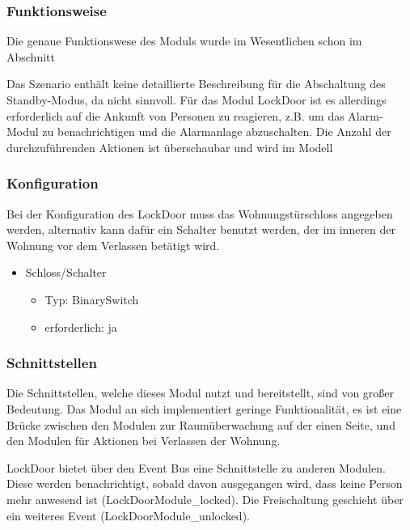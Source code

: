 \subsubsection{Funktionsweise}
Die genaue Funktionswese des Moduls wurde im Wesentlichen schon im Abschnitt %

Das Szenario enthält keine detaillierte Beschreibung für die Abschaltung des Standby-Modus, da nicht sinnvoll. Für das Modul LockDoor ist es allerdings erforderlich auf die Ankunft von Personen zu reagieren, z.B. um das Alarm-Modul zu benachrichtigen und die Alarmanlage abzuschalten. Die Anzahl der durchzuführenden Aktionen ist überschaubar und wird im Modell %


\subsubsection{Konfiguration}
Bei der Konfiguration des LockDoor muss das Wohnungstürschloss angegeben werden, alternativ kann dafür ein Schalter benutzt werden, der im inneren der Wohnung vor dem Verlassen betätigt wird. 
\begin{itemize}
	\item Schloss/Schalter
	\begin{itemize}
		\item Typ: BinarySwitch
		\item erforderlich: ja
	\end{itemize}
\end{itemize}

\subsubsection{Schnittstellen}
Die Schnittstellen, welche dieses Modul nutzt und bereitstellt, sind von großer Bedeutung. Das Modul an sich implementiert geringe Funktionalität, es ist eine Brücke zwischen den Modulen zur Raumüberwachung auf der einen Seite, und den Modulen für Aktionen bei Verlassen der Wohnung.

LockDoor bietet über den Event Bus eine Schnittstelle zu anderen Modulen. Diese werden benachrichtigt, sobald davon ausgegangen wird, dass keine Person mehr anwesend ist (LockDoorModule\_locked). Die Freischaltung geschieht über ein weiteres Event (LockDoorModule\_unlocked).

